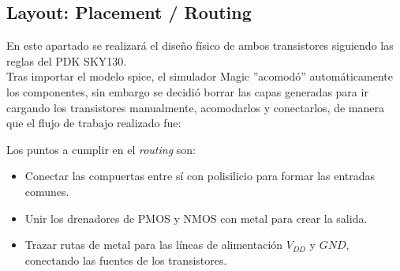 \subsection{Layout: Placement / Routing}
\sangria{} En este apartado se realizará el diseño físico de ambos transistores siguiendo las reglas del PDK SKY130. \\ \sangria{} Tras importar el modelo spice, el simulador Magic ''acomodó'' automáticamente los componentes, sin embargo se decidió borrar las capas generadas para ir cargando los transistores manualmente, acomodarlos y conectarlos, de manera que el flujo de trabajo realizado fue:
\begin{center}\end{center}
\sangria{} Los puntos a cumplir en el \textit{routing} son: \begin{itemize}[nosep] \item Conectar las compuertas entre sí con polisilicio para formar las entradas comunes. \item Unir los drenadores de PMOS y NMOS con metal para crear la salida. \item Trazar rutas de metal para las líneas de alimentación $V_{DD}$ y $GND$, conectando las fuentes de los transistores. \end{itemize}

